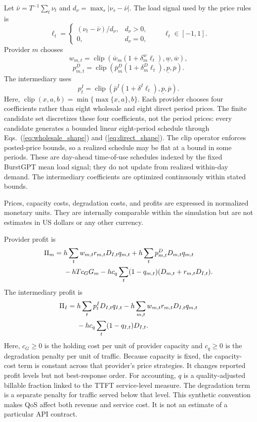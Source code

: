 \documentclass[11pt,a4paper]{article}
\begin{document}
Let $\bar\nu=T^{-1}\sum_t\nu_t$ and $d_\nu=\max_s|\nu_s-\bar\nu|$. The load signal used by the price rules is
\[
\ell_t=
\begin{cases}
(\nu_t-\bar\nu)/d_\nu, & d_\nu>0,\\
0, & d_\nu=0,
\end{cases}
\qquad \ell_t\in[-1,1].
\]
Provider $m$ chooses
\begin{equation}
w_{m,t}=\operatorname{clip}\!\left(\bar w_m(1+\delta^w_m\ell_t),\underline w,\overline w\right),
\label{eq:wholesale_shape}
\end{equation}
\begin{equation}
p^D_{m,t}=\operatorname{clip}\!\left(\bar p^D_m(1+\delta^D_m\ell_t),\underline p,\overline p\right).
\label{eq:direct_shape}
\end{equation}
The intermediary uses
\begin{equation}
p^I_t=\operatorname{clip}\!\left(\bar p^I(1+\delta^I\ell_t),\underline p,\overline p\right).
\label{eq:retail_shape}
\end{equation}
Here, $\operatorname{clip}(x,a,b)=\min\{\max\{x,a\},b\}$. Each provider chooses four coefficients rather than eight wholesale and eight direct period prices. The finite candidate set discretizes these four coefficients, not the period prices: every candidate generates a bounded linear eight-period schedule through Eqs.~(\ref{eq:wholesale_shape}) and (\ref{eq:direct_shape}). The clip operator enforces posted-price bounds, so a realized schedule may be flat at a bound in some periods. These are day-ahead time-of-use schedules indexed by the fixed BurstGPT mean load signal; they do not update from realized within-day demand. The intermediary coefficients are optimized continuously within stated bounds.

Prices, capacity costs, degradation costs, and profits are expressed in normalized monetary units. They are internally comparable within the simulation but are not estimates in US dollars or any other currency.

Provider profit is
\begin{align}
\Pi_m={}&h\sum_t w_{m,t}r_{m,t}D_{I,t}q_{m,t}
+h\sum_t p^D_{m,t}D_{m,t}q_{m,t} \notag\\
&-hTc_GG_m
-hc_q\sum_t(1-q_{m,t})(D_{m,t}+r_{m,t}D_{I,t}).
\label{eq:provider_profit}
\end{align}
The intermediary profit is
\begin{align}
\Pi_I={}&h\sum_t p^I_tD_{I,t}q_{I,t}
-h\sum_{m,t}w_{m,t}r_{m,t}D_{I,t}q_{m,t} \notag\\
&-hc_q\sum_t(1-q_{I,t})D_{I,t}.
\label{eq:intermediary_profit}
\end{align}
Here, $c_G\ge0$ is the holding cost per unit of provider capacity and $c_q\ge0$ is the degradation penalty per unit of traffic. Because capacity is fixed, the capacity-cost term is constant across that provider's price strategies. It changes reported profit levels but not best-response order. For accounting, $q$ is a quality-adjusted billable fraction linked to the TTFT service-level measure. The degradation term is a separate penalty for traffic served below that level. This synthetic convention makes QoS affect both revenue and service cost. It is not an estimate of a particular API contract.
\end{document}
